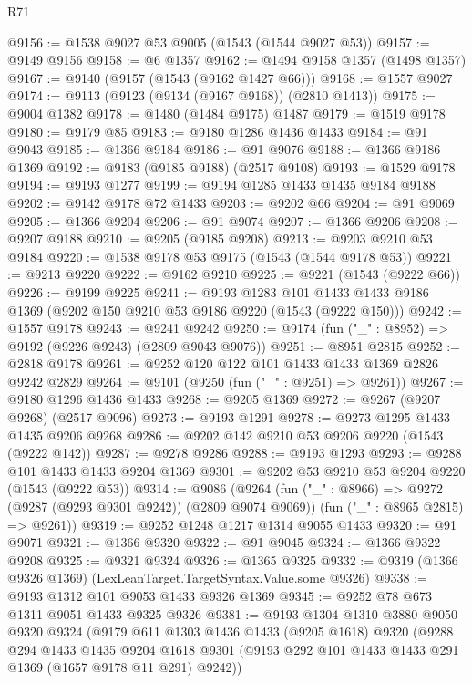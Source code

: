 \begin{lexlean}{R71}
\begin{coremodule}
@9156 := @1538 @9027 @53 @9005 (@1543 (@1544 @9027 @53))
@9157 := @9149 @9156
@9158 := @6 @1357
@9162 := @1494 @9158 @1357 (@1498 @1357)
@9167 := @9140 (@9157 (@1543 (@9162 @1427 @66)))
@9168 := @1557 @9027
@9174 := @9113 (@9123 (@9134 (@9167 @9168)) (@2810 @1413))
@9175 := @9004 @1382
@9178 := @1480 (@1484 @9175) @1487
@9179 := @1519 @9178
@9180 := @9179 @85
@9183 := @9180 @1286 @1436 @1433
@9184 := @91 @9043
@9185 := @1366 @9184
@9186 := @91 @9076
@9188 := @1366 @9186 @1369
@9192 := @9183 (@9185 @9188) (@2517 @9108)
@9193 := @1529 @9178
@9194 := @9193 @1277
@9199 := @9194 @1285 @1433 @1435 @9184 @9188
@9202 := @9142 @9178 @72 @1433
@9203 := @9202 @66
@9204 := @91 @9069
@9205 := @1366 @9204
@9206 := @91 @9074
@9207 := @1366 @9206
@9208 := @9207 @9188
@9210 := @9205 (@9185 @9208)
@9213 := @9203 @9210 @53 @9184
@9220 := @1538 @9178 @53 @9175 (@1543 (@1544 @9178 @53))
@9221 := @9213 @9220
@9222 := @9162 @9210
@9225 := @9221 (@1543 (@9222 @66))
@9226 := @9199 @9225
@9241 := @9193
    @1283
    @101
    @1433
    @1433
    @9186
    @1369
    (@9202 @150 @9210 @53 @9186 @9220 (@1543 (@9222 @150)))
@9242 := @1557 @9178
@9243 := @9241 @9242
@9250 := @9174 (fun ("_" : @8952) => @9192 (@9226 @9243) (@2809 @9043 @9076))
@9251 := @8951 @2815
@9252 := @2818 @9178
@9261 := @9252 @120 @122 @101 @1433 @1433 @1369 @2826 @9242 @2829
@9264 := @9101 (@9250 (fun ("_" : @9251) => @9261))
@9267 := @9180 @1296 @1436 @1433
@9268 := @9205 @1369
@9272 := @9267 (@9207 @9268) (@2517 @9096)
@9273 := @9193 @1291
@9278 := @9273 @1295 @1433 @1435 @9206 @9268
@9286 := @9202 @142 @9210 @53 @9206 @9220 (@1543 (@9222 @142))
@9287 := @9278 @9286
@9288 := @9193 @1293
@9293 := @9288 @101 @1433 @1433 @9204 @1369
@9301 := @9202 @53 @9210 @53 @9204 @9220 (@1543 (@9222 @53))
@9314 := @9086
    (@9264
      (fun ("_" : @8966) => @9272 (@9287 (@9293 @9301 @9242)) (@2809 @9074 @9069))
      (fun ("_" : @8965 @2815) => @9261))
@9319 := @9252 @1248 @1217 @1314 @9055 @1433
@9320 := @91 @9071
@9321 := @1366 @9320
@9322 := @91 @9045
@9324 := @1366 @9322 @9208
@9325 := @9321 @9324
@9326 := @1365 @9325
@9332 := @9319 (@1366 @9326 @1369) (LexLeanTarget.TargetSyntax.Value.some @9326)
@9338 := @9193 @1312 @101 @9053 @1433 @9326 @1369
@9345 := @9252 @78 @673 @1311 @9051 @1433 @9325 @9326
@9381 := @9193
    @1304
    @1310
    @3880
    @9050
    @9320
    @9324
    (@9179
      @611
      @1303
      @1436
      @1433
      (@9205 @1618)
      @9320
      (@9288
        @294
        @1433
        @1435
        @9204
        @1618
        @9301
        (@9193 @292 @101 @1433 @1433 @291 @1369 (@1657 @9178 @11 @291) @9242))

\end{coremodule}
\end{lexlean}
